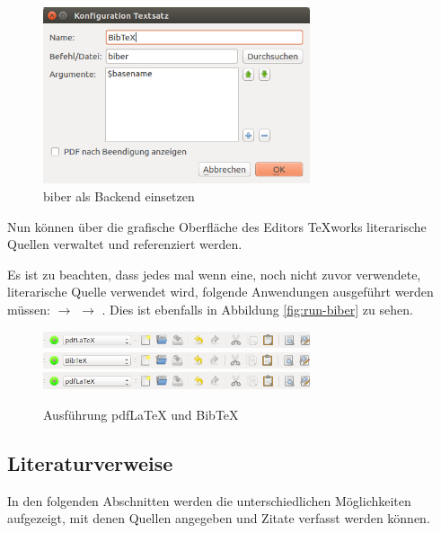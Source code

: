 \begin{figure}
	\centering
	\includegraphics[width=0.7\textwidth]{bilder/konfiguration-biber-02.png}
	\caption{biber als Backend einsetzen}
	\label{fig:konfiguration-biber-02}
\end{figure}

Nun können über die grafische Oberfläche des Editors TeXworks literarische Quellen verwaltet und referenziert werden.

Es ist zu beachten, dass jedes mal wenn eine, noch nicht zuvor verwendete, literarische Quelle verwendet wird, folgende Anwendungen ausgeführt werden müssen:  $\rightarrow$  $\rightarrow$ . Dies ist ebenfalls in Abbildung \vref{fig:run-biber} zu sehen.

\begin{figure}
	\centering
	\includegraphics[width=0.7\textwidth]{bilder/run-biber-01.png}
	\includegraphics[width=0.7\textwidth]{bilder/run-biber-02.png}
	\includegraphics[width=0.7\textwidth]{bilder/run-biber-01.png}
	\caption{Ausführung pdfLaTeX und BibTeX}
	\label{fig:run-biber}
\end{figure}


\subsection{Literaturverweise}

In den folgenden Abschnitten werden die unterschiedlichen Möglichkeiten aufgezeigt, mit denen Quellen angegeben und Zitate verfasst werden können.


